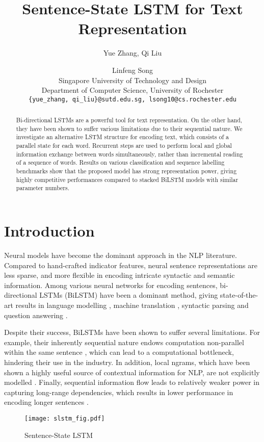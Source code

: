 \documentclass[11pt,a4paper]{article}
\title{Sentence-State LSTM for Text Representation}
\author{Yue Zhang, Qi Liu \and Linfeng Song \\
  Singapore University of Technology and Design \\
  Department of Computer Science, University of Rochester \\
  {\tt \{yue\_zhang, qi\_liu\}@sutd.edu.sg, lsong10@cs.rochester.edu} \\ }
\date{}
\begin{document}
\maketitle
\begin{abstract}
Bi-directional LSTMs are a powerful tool for text representation. 
On the other hand, they have been shown to suffer various limitations due to their sequential nature. 
We investigate an alternative LSTM structure for encoding text, which consists of a parallel state for each word. Recurrent steps are used to perform local and global information exchange between words simultaneously, rather than incremental reading of a sequence of words. 
Results on various classification and sequence labelling benchmarks show that the proposed model has strong representation power, giving highly competitive performances compared to stacked BiLSTM models with similar parameter numbers.
\end{abstract}


\section{Introduction}
Neural models have become the dominant approach in the NLP literature.
Compared to hand-crafted indicator features, neural sentence representations are less sparse, and more flexible in encoding intricate syntactic and semantic information. 
Among various neural networks for encoding sentences, bi-directional LSTMs (BiLSTM) \cite{hochreiter1997long} have been a dominant method, giving state-of-the-art results in language modelling \cite{sundermeyer2012lstm}, machine translation \cite{bahdanau2014neural}, syntactic parsing \cite{dozat2016deep} and question answering \cite{tan2015lstm}. 


Despite their success, BiLSTMs have been shown to suffer several limitations. 
For example, their inherently sequential nature endows computation non-parallel within the same sentence \cite{vaswani2017attention}, which can lead to a computational bottleneck, hindering their use in the industry.
In addition, local ngrams, which have been shown a highly useful source of contextual information for NLP, are not explicitly modelled  \cite{wang2016combination}. 
Finally, sequential information flow leads to relatively weaker power in capturing long-range dependencies, which results in lower performance in encoding longer sentences \cite{koehn2017six}.

\begin{figure}[t]
\centering	
\texttt{[image: slstm\_fig.pdf]}
\caption{Sentence-State LSTM}
\label{fig:mlstm}
\end{figure}
\end{document}
